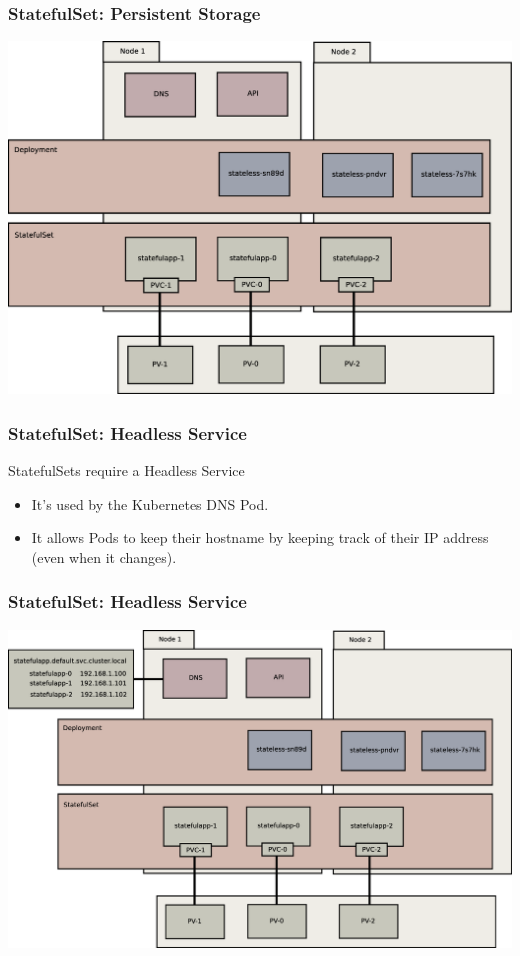 \documentclass{beamer}
\begin{document}
\begin{frame}
    \frametitle{StatefulSet: Persistent Storage}
    \includegraphics[width=\textwidth,height=0.85\textheight,keepaspectratio]{graphics/06-persistence.eps}
\end{frame}

\begin{frame}
    \frametitle{StatefulSet: Headless Service}
    StatefulSets require a Headless Service
    \begin{itemize}
        \item It's used by the Kubernetes DNS Pod.
        \item It allows Pods to keep their hostname by keeping track of their IP address (even when it changes).
    \end{itemize}
\end{frame}

\begin{frame}
    \frametitle{StatefulSet: Headless Service}
    \includegraphics[width=\textwidth,height=0.85\textheight,keepaspectratio]{graphics/07-persistentIdentity.eps}
\end{frame}
\end{document}

